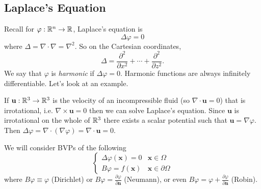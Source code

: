 \documentclass{article}
\begin{document}
\subsection{Laplace's Equation}
Recall for $ \varphi:\mathbb{R}^n\to \mathbb{R} $, Laplace's equation is
\[
  \Delta \varphi = 0
\]
where $ \Delta=\nabla\cdot\nabla=\nabla^2 $. So on the Cartesian coordinates,
\[
	\Delta = \frac{\partial^2}{\partial x^2}+\cdots + \frac{\partial^2}{\partial z^2}.
\]
We say that $ \varphi $ is \textit{harmonic} if $ \Delta\varphi=0 $. Harmonic functions are always infinitely differentiable. Let's look at an example.\par
If $ \mathbf u:\mathbb{R}^3\to \mathbb{R}^3 $ is the velocity of an incompressible fluid (so $ \nabla\cdot \mathbf u=0 $) that is irrotational, i.e. $ \nabla\times \mathbf u = 0 $ then we can solve Laplace's equation. Since $ \mathbf u $ is irrotational on the whole of $ \mathbb{R}^3 $ there exists a scalar potential such that $ \mathbf u =\nabla \varphi $. Then $ \Delta\varphi=\nabla\cdot(\nabla \varphi)=\nabla\cdot\mathbf u= 0$.\par
We will consider  BVPs of the following
\[
  \begin{cases}
	  \Delta\varphi(\mathbf x)=0&\mathbf x \in \Omega\\
	  B\varphi=f(\mathbf x)& \mathbf x \in \partial\Omega
  \end{cases}
\]
where $ B\varphi\equiv \varphi $ (Dirichlet) or $ B\varphi=\frac{\partial \varphi}{\partial \mathbf n} $ (Neumann), or even $ B\varphi = \varphi + \frac{\partial \varphi}{\partial\mathbf n} $ (Robin).
\end{document}
